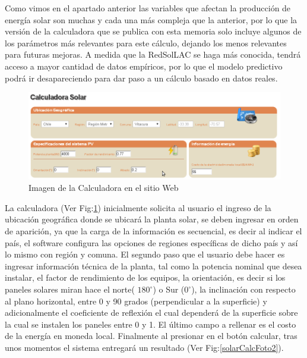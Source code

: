 Como vimos en el apartado anterior las variables que afectan la producción de energía solar son muchas y cada una más compleja que la anterior, por lo que la versión de la calculadora que se publica con esta memoria solo incluye algunos de los parámetros más relevantes para este cálculo, dejando los menos relevantes para futuras mejoras. A medida que la RedSolLAC se haga más conocida, tendrá acceso a mayor cantidad de datos empíricos, por lo que el modelo predictivo podrá ir desapareciendo para dar paso a un cálculo basado en datos reales.\\

\begin{figure}[h!]
        \centering
        \includegraphics[scale=0.5]{images/calculadoraFoto1}
        \caption{Imagen de la Calculadora en el sitio Web}
        \label{solarCalcFoto1}
\end{figure}

La calculadora (Ver Fig:\ref{solarCalcFoto1}) inicialmente solicita al usuario el ingreso de la ubicación geográfica donde se ubicará la planta solar, se deben ingresar en orden de aparición, ya que la carga de la información es secuencial, es decir al indicar el país, el software configura las opciones de regiones específicas de dicho país y así lo mismo con región y comuna. El segundo paso que el usuario debe hacer es ingresar información técnica de la planta, tal como la potencia nominal que desea instalar, el factor de rendimiento de los equipos, la orientación, es decir si los paneles solares miran hace el norte( $180^{\circ}$) o Sur ($0^{\circ}$), la inclinación con respecto al plano horizontal, entre 0 y 90 grados (perpendicular a la superficie) y adicionalmente el coeficiente de reflexión el cual dependerá de la superficie sobre la cual se instalen los paneles entre 0 y 1. El último campo a rellenar es el costo de la energía en moneda local. Finalmente al presionar en el botón calcular, tras unos momentos el sistema entregará un resultado (Ver Fig:\ref{solarCalcFoto2}).\\


